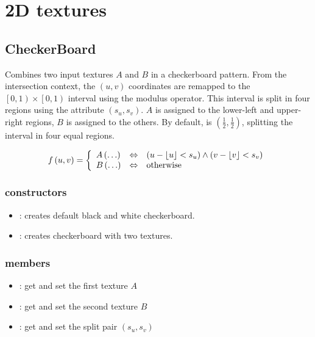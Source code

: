 \section{2D textures} %



\subsection{CheckerBoard}\label{textures.CheckerBoard}

Combines two input textures $A$ and $B$ in a checkerboard pattern.  From the intersection context, the $\left(u, v\right)$ coordinates are remapped to the $\left[0, 1\right) \times \left[0, 1\right)$ interval using the modulus operator.  This interval is split in four regions using the  attribute $\left(s_u, s_v\right)$.  $A$ is assigned to the lower-left and upper-right regions, $B$ is assigned to the others.  By default,  is $\left(\frac 1 2, \frac 1 2\right)$, splitting the interval in four equal regions.

\begin{equation}
	f\left(u, v\right) = \left\{
		\begin{array}{lcl}
			A\left(\ldots\right) & \Leftrightarrow & 
				\left(u - \left\lfloor u \right\rfloor < s_u\right) \wedge
				\left(v - \left\lfloor v \right\rfloor < s_v\right) \\
			B\left(\ldots\right) & \Leftrightarrow & \textnormal{otherwise}
		\end{array}
	\right.
\end{equation}

\subsubsection*{constructors}
\begin{itemize}
	\item {}: 
		creates default black and white checkerboard.
	\item {}: 
		creates checkerboard with two textures.
\end{itemize}

\subsubsection*{members}
\begin{itemize}
	\item {}: 
		get and set the first texture $A$
	\item {}: 
		get and set the second texture $B$
	\item {}: 
		get and set the split pair $\left(s_u, s_v\right)$
\end{itemize}



